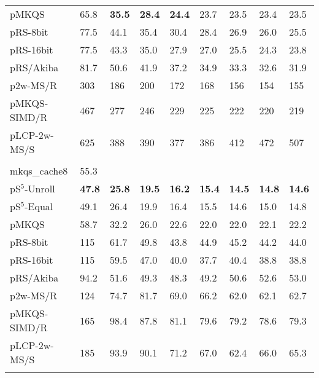 \documentclass[a4paper]{myjournal}
\begin{document}
\begin{table}
\begin{tabularx}{\linewidth}{l|*{8}{>{\hfill}X}|@{}}
        pMKQS & 65.8 & \bf 35.5 & \bf 28.4 & \bf 24.4 &     23.7 &     23.5 &     23.4 &     23.5 \\
     pRS-8bit & 77.5 &     44.1 &     35.4 &     30.4 &     28.4 &     26.9 &     26.0 &     25.5 \\
    pRS-16bit & 77.5 &     43.3 &     35.0 &     27.9 &     27.0 &     25.5 &     24.3 &     23.8 \\
    pRS/Akiba & 81.7 &     50.6 &     41.9 &     37.2 &     34.9 &     33.3 &     32.6 &     31.9 \\
     p2w-MS/R &  303 &      186 &      200 &      172 &      168 &      156 &      154 &      155 \\
 pMKQS-SIMD/R &  467 &      277 &      246 &      229 &      225 &      222 &      220 &      219 \\
 pLCP-2w-MS/S &  625 &      388 &      390 &      377 &      386 &      412 &      472 &      507 \\ \hline
& \multicolumn{8}{l|}{\textbf{GOV2}, $n = 166\,\text{M}$, $N = 8\,\text{Gi}$, $\frac{D}{N} = 70.6\,\%$} \\ \cline{2-9}
mkqs\_cache8 & 55.3 &  &  &  &  &  &  &  \\
pS$^5$-Unroll & \bf 47.8 & \bf 25.8 & \bf 19.5 & \bf 16.2 & \bf 15.4 & \bf 14.5 & \bf 14.8 & \bf 14.6 \\
 pS$^5$-Equal &     49.1 &     26.4 &     19.9 &     16.4 &     15.5 &     14.6 &     15.0 &     14.8 \\
        pMKQS &     58.7 &     32.2 &     26.0 &     22.6 &     22.0 &     22.0 &     22.1 &     22.2 \\
     pRS-8bit &      115 &     61.7 &     49.8 &     43.8 &     44.9 &     45.2 &     44.2 &     44.0 \\
    pRS-16bit &      115 &     59.5 &     47.0 &     40.0 &     37.7 &     40.4 &     38.8 &     38.8 \\
    pRS/Akiba &     94.2 &     51.6 &     49.3 &     48.3 &     49.2 &     50.6 &     52.6 &     53.0 \\
     p2w-MS/R &      124 &     74.7 &     81.7 &     69.0 &     66.2 &     62.0 &     62.1 &     62.7 \\
 pMKQS-SIMD/R &      165 &     98.4 &     87.8 &     81.1 &     79.6 &     79.2 &     78.6 &     79.3 \\
 pLCP-2w-MS/S &      185 &     93.9 &     90.1 &     71.2 &     67.0 &     62.4 &     66.0 &     65.3 \\ \hline
& \multicolumn{8}{l|}{\textbf{Wikipedia}, $n = N = 512\,\text{Mi}$, $D = 21.5\,\text{G}$} \\ \cline{2-9}

\end{tabularx}
\end{table}
\end{document}
